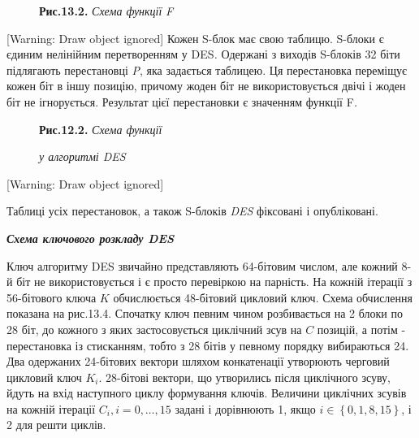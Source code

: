 \begin{figure}
\centering
\begin{minipage}{2.1043in}
\textbf{Рис.13.2.}\textit{ Схема функції }\textit{F}
\end{minipage}
\end{figure}
[Warning: Draw object ignored] Кожен S-блок має свою таблицю.  S-блоки є єдиним
нелінійним перетворенням у DES\textit{.} Одержані з виходів S-блоків 32 біти
підлягають перестановці \textit{P}, яка задається таблицею. Ця перестановка
переміщує кожен біт в іншу позицію, причому жоден біт не використовується двічі
і жоден біт не ігнорується. Результат цієї перестановки є значенням функції
F\textit{.}

\begin{figure}
\centering
\begin{minipage}{2.6437in}
{\centering
\textbf{Рис.12.2. }\textit{Схема функції } $ $
\par}

{\centering\itshape
у алгоритмі DES
\par}
\end{minipage}
\end{figure}

\bigskip

[Warning: Draw object ignored]


\bigskip


\bigskip


\bigskip


\bigskip


\bigskip


\bigskip


\bigskip


\bigskip


\bigskip


\bigskip


\bigskip

Таблиці усіх перестановок, а також S-блоків \textit{DES} фіксовані і
опубліковані.


\bigskip

{\centering\bfseries\itshape
Схема ключового розкладу DES
\par}


\bigskip

  Ключ алгоритму DES звичайно представляють 64-бітовим числом, але  кожний 8-й
біт не використовується і є просто перевіркою на парність. На кожній ітерації з
56-бітового ключа  ${K}$\textit{ }обчислюється 48-бітовий цикловий ключ. Схема
обчислення показана на рис.13.4. Спочатку ключ певним чином розбивається на 2
блоки по 28 біт, до кожного з яких застосовується циклічний зсув на  ${C}$
позицій, а потім - перестановка із стисканням, тобто  з 28 бітів у певному
порядку вибираються 24. Два одержаних 24-бітових вектори шляхом конкатенації
утворюють черговий цикловий ключ  ${K_{{i}}}$. 28-бітові вектори, що утворились
після циклічного зсуву, йдуть на вхід наступного циклу формування ключів.
Величини циклічних зсувів на кожній ітерації 
${C_{{i}},i=0,\dots,\text{15}}$ задані і дорівнюють 1, якщо 
${i\in \left\{0,1,8,\text{15}\right\}}$, і 2 для решти циклів.

